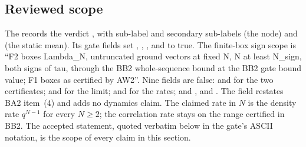 \subsection{Reviewed scope}
\label{sec:bc1-scope}
The  records the
verdict , with sub-label
 and secondary sub-labels
 (the node) and  (the
static mean). Its gate fields set ,
, ,
 and  to
true. The finite-box sign scope is ``F2 boxes Lambda\_N, untruncated ground
vectors at fixed N, N at least N\_sign, both signs of tau, through the BB2
whole-sequence bound at the BB2 gate bound value; F1 boxes as certified by
AW2''. Nine fields are false:  and
 for the two certificates;
 and
 for the limit;
 and  for the rates;
and ,  and
. The field  restates BA2
item~(4) and adds no dynamics claim. The claimed rate in $N$ is the density
rate $q^{N-1}$ for every $N\ge2$; the correlation rate stays on the range
certified in BB2. The accepted statement, quoted verbatim below in the gate's
ASCII notation, is the scope of every claim in this section.
